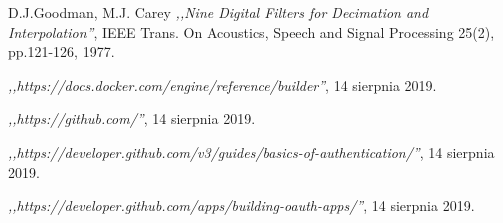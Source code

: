 \begin{thebibliography}{99}
 D.J.Goodman, M.J. Carey \emph{,,Nine Digital Filters for Decimation and Interpolation''}, IEEE Trans. On Acoustics, Speech and Signal Processing 25(2), pp.121-126, 1977.

  \emph{,,https://docs.docker.com/engine/reference/builder''}, 14 sierpnia 2019.

 \emph{,,https://github.com/''}, 14 sierpnia 2019.

 \emph{,,https://developer.github.com/v3/guides/basics-of-authentication/''}, 14 sierpnia 2019.

 \emph{,,https://developer.github.com/apps/building-oauth-apps/''}, 14 sierpnia 2019.

\end{thebibliography}
\clearpage




